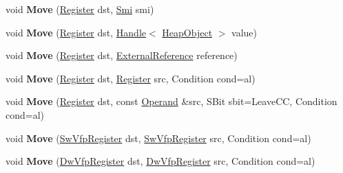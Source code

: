 \begin{DoxyCompactItemize}
void {\bfseries Move} (\mbox{\hyperlink{classv8_1_1internal_1_1Register}{Register}} dst, \mbox{\hyperlink{classv8_1_1internal_1_1Smi}{Smi}} smi)
\item 
\mbox{\label{classv8_1_1internal_1_1TurboAssembler_ac4d20b0a7501ea25ed334fa37bdaa5ec}} 
void {\bfseries Move} (\mbox{\hyperlink{classv8_1_1internal_1_1Register}{Register}} dst, \mbox{\hyperlink{classv8_1_1internal_1_1Handle}{Handle}}$<$ \mbox{\hyperlink{classv8_1_1internal_1_1HeapObject}{Heap\+Object}} $>$ value)
\item 
\mbox{\label{classv8_1_1internal_1_1TurboAssembler_a227cfc1b14563ed7f3317656ac43f52e}} 
void {\bfseries Move} (\mbox{\hyperlink{classv8_1_1internal_1_1Register}{Register}} dst, \mbox{\hyperlink{classv8_1_1internal_1_1ExternalReference}{External\+Reference}} reference)
\item 
\mbox{\label{classv8_1_1internal_1_1TurboAssembler_a88d5d9a1115804b2765416e4d7fec7cf}} 
void {\bfseries Move} (\mbox{\hyperlink{classv8_1_1internal_1_1Register}{Register}} dst, \mbox{\hyperlink{classv8_1_1internal_1_1Register}{Register}} src, Condition cond=al)
\item 
\mbox{\label{classv8_1_1internal_1_1TurboAssembler_a7e9e95d5f60c7ed0e3b476837ef36311}} 
void {\bfseries Move} (\mbox{\hyperlink{classv8_1_1internal_1_1Register}{Register}} dst, const \mbox{\hyperlink{classv8_1_1internal_1_1Operand}{Operand}} \&src, S\+Bit sbit=Leave\+CC, Condition cond=al)
\item 
\mbox{\label{classv8_1_1internal_1_1TurboAssembler_af2d44016fa07070d881b38c29ad8e98f}} 
void {\bfseries Move} (\mbox{\hyperlink{classv8_1_1internal_1_1SwVfpRegister}{Sw\+Vfp\+Register}} dst, \mbox{\hyperlink{classv8_1_1internal_1_1SwVfpRegister}{Sw\+Vfp\+Register}} src, Condition cond=al)
\item 
\mbox{\label{classv8_1_1internal_1_1TurboAssembler_afaf5587a243e7007094c044f4f0fadf2}} 
void {\bfseries Move} (\mbox{\hyperlink{classv8_1_1internal_1_1DwVfpRegister}{Dw\+Vfp\+Register}} dst, \mbox{\hyperlink{classv8_1_1internal_1_1DwVfpRegister}{Dw\+Vfp\+Register}} src, Condition cond=al)

\end{DoxyCompactItemize}
